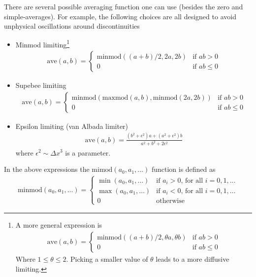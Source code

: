 \documentclass[11pt, reqno]{amsart}
\theoremstyle{definition}
\begin{document}
There are several possible averaging function one can use (besides the
zero and simple-averages). For example, the following choices are all
designed to avoid unphysical oscillations around discontinuities
\begin{itemize}
  \item Minmod limiting\footnote{A more general expression is
      \begin{align}
        \mathrm{ave}(a,b) = 
        \begin{cases}
          \mathrm{minmod}((a+b)/2, \theta a, \theta b)& \text{if $ab>0$} \\
          0& \text{if $ab\le 0$}
        \end{cases}
      \end{align}
      Where $1\le \theta \le 2$. Picking a smaller value of $\theta$
      leads to a more diffusive limiting.
    }
    \begin{align}
      \mathrm{ave}(a,b) = 
      \begin{cases}
        \mathrm{minmod}((a+b)/2, 2a, 2b)& \text{if $ab>0$} \\
        0& \text{if $ab\le 0$}
      \end{cases}
    \end{align}

  \item Supebee limiting
    \begin{align}
      \mathrm{ave}(a,b) = 
      \begin{cases}
        \mathrm{minmod}\left(
          \mathrm{maxmod}(a,b), \mathrm{minmod}(2a,2b)
          \right)& \text{if $ab>0$} \\
        0& \text{if $ab\le 0$}
      \end{cases}
    \end{align}

  \item Epsilon limiting (van Albada limiter)
    \begin{align}
      \mathrm{ave}(a,b) = \frac{(b^2+\epsilon^2)a + (a^2+\epsilon^2)b}{a^2+b^2+2\epsilon^2}
    \end{align}
    where $\epsilon^2 \sim \Delta x^3$ is a parameter.
\end{itemize}
In the above expressions the $\mathrm{mimod}(a_0,a_1,\ldots)$ function
is defined as
\begin{align}
  \mathrm{minmod}(a_0,a_1,\ldots) =
  \begin{cases}
    \min(a_0,a_1,\ldots)& \text{if $a_i>0$, for all $i=0,1,\ldots$} \\
    \max(a_0,a_1,\ldots)& \text{if $a_i<0$, for all $i=0,1,\ldots$} \\
    0& \text{otherwise}
  \end{cases}
\end{align}
\end{document}
